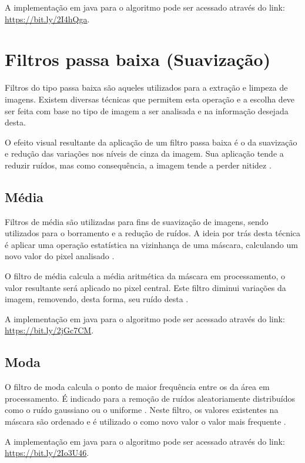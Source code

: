\documentclass[
	12pt,				%
	oneside,			%
	a4paper,			%
	english,			%
	french,				%
	spanish,			%
	brazil,				%
	]{abntex2}
\begin{document}
A implementação em java para o algoritmo pode ser acessado através do link: \url{https://bit.ly/2I4hQga}.

\section{Filtros passa baixa (Suavização)}
Filtros do tipo passa baixa são aqueles utilizados para a extração e limpeza de imagens. Existem diversas técnicas que permitem esta operação e a escolha deve ser feita com base no tipo de imagem a ser analisada e na informação desejada desta. 

O efeito visual resultante da aplicação de um filtro passa baixa é o da suavização e redução das variações nos níveis de cinza da imagem. Sua aplicação tende a reduzir ruídos, mas como consequência, a imagem tende a perder nitidez \cite{conciAzevedoLeta:2008}.

\subsection{Média}
Filtros de média são utilizadas para fins de suavização de imagens, sendo utilizados para o borramento e a redução de ruídos. A ideia por trás desta técnica é aplicar uma operação estatística na vizinhança de uma máscara, calculando um novo valor do pixel analisado \cite{gonzalesWoods:2008}. 

O filtro de média calcula a média aritmética da máscara em processamento, o valor resultante será aplicado no pixel central. Este filtro diminui variações da imagem, removendo, desta forma, seu ruído desta \cite{gonzalesWoods:2008}.

A implementação em java para o algoritmo pode ser acessado através do link: \url{https://bit.ly/2jGc7CM}. 

\subsection{Moda}
O filtro de moda calcula o ponto de maior frequência entre os da área em processamento. É indicado para a remoção de ruídos aleatoriamente distribuídos como o ruído gaussiano ou o uniforme \cite{gonzalesWoods:2008}. Neste filtro, os valores existentes na máscara são ordenado e é utilizado o como novo valor o valor mais frequente \cite{conciAzevedoLeta:2008}.

A implementação em java para o algoritmo pode ser acessado através do link: \url{https://bit.ly/2Io3U46}.
\end{document}
